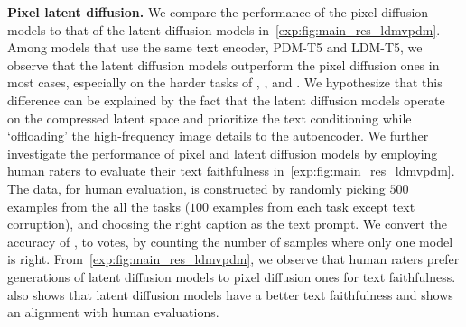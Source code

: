 \par \noindent \textbf{Pixel \vs latent diffusion.}
We compare the \OURS performance of the pixel diffusion models to that of the latent diffusion models in~\cref{exp:fig:main_res_ldmvpdm}.
Among models that use the same text encoder, \ie PDM-T5 and LDM-T5, we observe that the latent diffusion models outperform the pixel diffusion ones in most cases, especially on the harder tasks of , ,  and .
We hypothesize that this difference can be explained by the fact that the latent diffusion models operate on the compressed latent space and prioritize the text conditioning while `offloading' the high-frequency image details to the autoencoder.
We further investigate the performance of pixel and latent diffusion models by employing human raters to evaluate their text faithfulness in~\cref{exp:fig:main_res_ldmvpdm}.
The data, for human evaluation, is constructed by randomly picking $500$ examples from the all the tasks ($100$ examples from each task except text corruption), and choosing the right caption as the text prompt.
We convert the accuracy of \OURS, to votes, by counting the number of samples where only one model is right.
From~\cref{exp:fig:main_res_ldmvpdm}, we observe that human raters prefer generations of latent diffusion models to pixel diffusion ones for text faithfulness. \OURS also shows that latent diffusion models have a better text faithfulness and shows an alignment with human evaluations.




